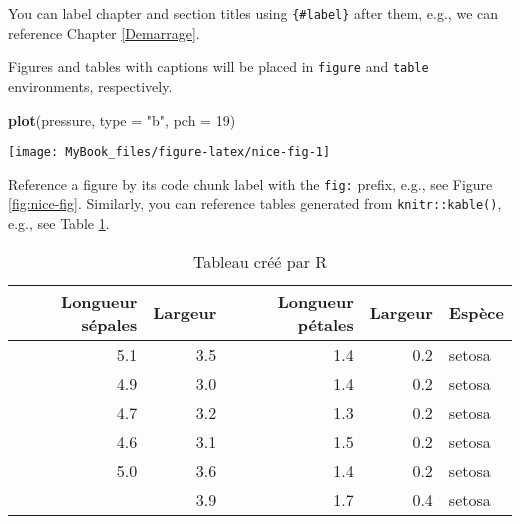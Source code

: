 \documentclass[
  11pt,
  french,
  a4paper,
  extrafontsizes,onecolumn,openright
  ]{memoir}
\newenvironment{Shaded}{\begin{snugshade}}{\end{snugshade}}
\newcommand{\DataTypeTok}[1]{\textcolor[rgb]{0.13,0.29,0.53}{#1}}
\newcommand{\DecValTok}[1]{\textcolor[rgb]{0.00,0.00,0.81}{#1}}
\newcommand{\KeywordTok}[1]{\textcolor[rgb]{0.13,0.29,0.53}{\textbf{#1}}}
\newcommand{\NormalTok}[1]{#1}
\newcommand{\StringTok}[1]{\textcolor[rgb]{0.31,0.60,0.02}{#1}}
\begin{document}
You can label chapter and section titles using \texttt{\{\#label\}} after them, e.g., we can reference Chapter \ref{Demarrage}.

Figures and tables with captions will be placed in \texttt{figure} and \texttt{table} environments, respectively.

\scriptsize

\begin{Shaded}
\begin{Highlighting}[]
\KeywordTok{plot}\NormalTok{(pressure, }\DataTypeTok{type =} \StringTok{"b"}\NormalTok{, }\DataTypeTok{pch =} \DecValTok{19}\NormalTok{)}
\end{Highlighting}
\end{Shaded}

\begin{SCfigure}

{\centering \texttt{[image: MyBook\_files/figure-latex/nice-fig-1]} 

}

\caption{Here is a nice figure! It has a long, long, long, long, long, long, long, long, long, long, long, long, long, long, long, long, long, long, long, long, caption}\label{fig:nice-fig}
\end{SCfigure}

\normalsize

Reference a figure by its code chunk label with the \texttt{fig:} prefix, e.g., see Figure \ref{fig:nice-fig}. Similarly, you can reference tables generated from \texttt{knitr::kable()}, e.g., see Table \ref{tab:kable}.

\scriptsize

\begin{longtable}[t]{rrrrl}
\caption{\label{tab:kable}Tableau créé par R}\\
\toprule
Longueur sépales & Largeur & Longueur pétales & Largeur & Espèce\\
\midrule
5.1 & 3.5 & 1.4 & 0.2 & setosa\\
4.9 & 3.0 & 1.4 & 0.2 & setosa\\
4.7 & 3.2 & 1.3 & 0.2 & setosa\\
4.6 & 3.1 & 1.5 & 0.2 & setosa\\
5.0 & 3.6 & 1.4 & 0.2 & setosa\\
\addlinespace
5.4 & 3.9 & 1.7 & 0.4 & setosa\\
\bottomrule
\end{longtable}

\normalsize
\end{document}
